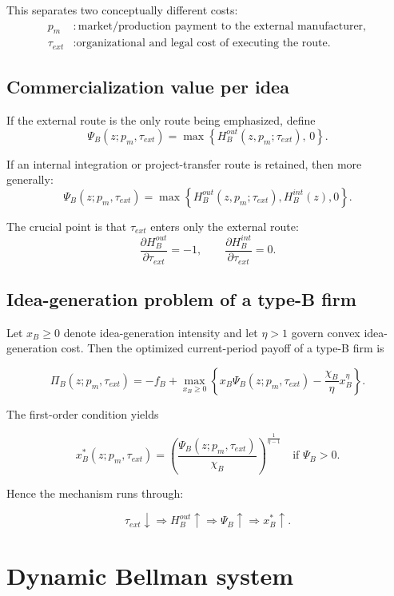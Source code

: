 \documentclass[12pt]{article}
\begin{document}
This separates two conceptually different costs:
\begin{align*}
p_m & : \text{market/production payment to the external manufacturer},\\
\tau_{ext} & : \text{organizational and legal cost of executing the route.}
\end{align*}

\subsection{Commercialization value per idea}

If the external route is the only route being emphasized, define
\[
\Psi_B(z;p_m,\tau_{ext})=\max\left\{H_B^{out}(z,p_m;\tau_{ext}),\,0\right\}.
\]

If an internal integration or project-transfer route is retained, then more generally:
\[
\Psi_B(z;p_m,\tau_{ext})
=
\max\left\{
H_B^{out}(z,p_m;\tau_{ext}),
H_B^{int}(z),
0
\right\}.
\]

The crucial point is that \(\tau_{ext}\) enters only the external route:
\[
\frac{\partial H_B^{out}}{\partial \tau_{ext}}=-1,
\qquad
\frac{\partial H_B^{int}}{\partial \tau_{ext}}=0.
\]

\subsection{Idea-generation problem of a type-B firm}

Let \(x_B \ge 0\) denote idea-generation intensity and let \(\eta>1\) govern convex idea-generation cost.
Then the optimized current-period payoff of a type-B firm is

\[
\Pi_B(z;p_m,\tau_{ext})
=
-f_B
+
\max_{x_B\ge 0}
\left\{
x_B\Psi_B(z;p_m,\tau_{ext})
-\frac{\chi_B}{\eta}x_B^\eta
\right\}.
\]

The first-order condition yields

\[
x_B^*(z;p_m,\tau_{ext})
=
\left(
\frac{\Psi_B(z;p_m,\tau_{ext})}{\chi_B}
\right)^{\frac{1}{\eta-1}}
\quad \text{if } \Psi_B>0.
\]

Hence the mechanism runs through:

\[
\tau_{ext}\downarrow
\Rightarrow
H_B^{out}\uparrow
\Rightarrow
\Psi_B\uparrow
\Rightarrow
x_B^*\uparrow.
\]

\section{Dynamic Bellman system}
\end{document}
